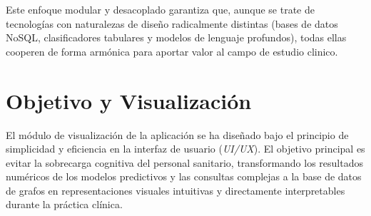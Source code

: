 \documentclass[12pt,a4paper,onecolumn,oneside]{report}
\begin{document}
Este enfoque modular y desacoplado garantiza que, aunque se trate de tecnologías con naturalezas de diseño radicalmente distintas (bases de datos NoSQL, clasificadores tabulares y modelos de lenguaje profundos), todas ellas cooperen de forma armónica para aportar valor al campo de estudio clinico.

\section{Objetivo y Visualización}

El módulo de visualización de la aplicación se ha diseñado bajo el principio de simplicidad y eficiencia en la interfaz de usuario (\textit{UI/UX}). El objetivo principal es evitar la sobrecarga cognitiva del personal sanitario, transformando los resultados numéricos de los modelos predictivos y las consultas complejas a la base de datos de grafos en representaciones visuales intuitivas y directamente interpretables durante la práctica clínica.
\end{document}
